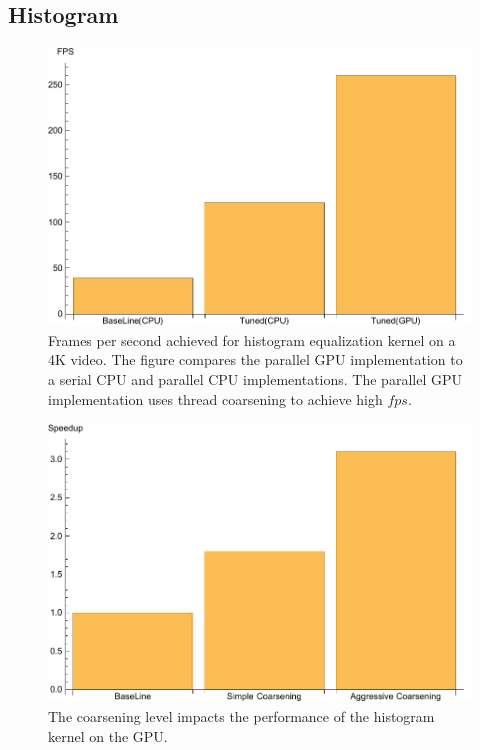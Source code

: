  

\subsection{Histogram}

\begin{figure}
\centering
\includegraphics[scale=0.5]{data/histogram.pdf}
\caption{Frames per second achieved for histogram equalization kernel on a 4K
video. The figure compares the parallel GPU implementation to a serial CPU and
parallel CPU implementations. The parallel GPU implementation uses thread
coarsening to achieve high $fps$.}
\label{fig:histogram}
\centering
\end{figure}


\begin{figure}
\centering
\includegraphics[scale=0.5]{data/histogramc.pdf}
\caption{The coarsening level impacts the performance of the histogram kernel on the GPU.}
\label{fig:histogramCoarsining}
\centering
\end{figure}

